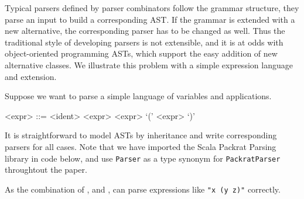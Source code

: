 
Typical parsers defined by parser combinators follow the grammar
structure, they parse an input to build a corresponding AST. If the grammar is extended
with a new alternative, the corresponding parser has to be changed as
well. Thus the traditional style of developing parsers is not
extensible, and it is at odds with object-oriented programming ASTs,
which support the easy addition of new alternative classes. We
illustrate this problem with a simple expression language and extension.

Suppose we want to parse a simple language of variables and
applications.

\setlength{\grammarindent}{5em}
\begin{grammar}
<expr> ::= <ident>
    \alt <expr> <expr>
    \alt `(' <expr> `)'
\end{grammar}

It is straightforward to model ASTs by inheritance and write corresponding parsers for all cases. Note that we have imported
the Scala Packrat Parsing library in code below, and use \lstinline{Parser} as a type synonym for \lstinline{PackratParser} throughtout the paper. 



\noindent As the combination of ,  and ,  can parse expressions like \lstinline{"x (y z)"} correctly.

